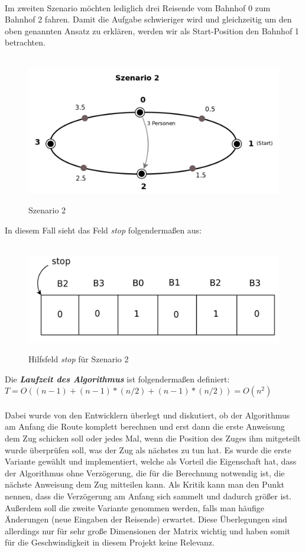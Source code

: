 \\
\noindent
Im zweiten Szenario möchten lediglich drei Reisende vom Bahnhof 0 zum Bahnhof 2 fahren. Damit die Aufgabe schwieriger wird und gleichzeitig um den oben genannten Ansatz zu erklären, werden wir als Start-Position den Bahnhof 1 betrachten.\\
\\
\begin{figure}[H]	
\caption{Szenario 2}
\includegraphics[width=2\textwidth, width=450pt]{content/images/szenario2.png}
\label{pic:szenario2}
\end{figure}
\noindent
In diesem Fall sieht das Feld \textit{stop} folgendermaßen aus:\\
\\
\begin{figure}[H]	
\caption{Hilfsfeld \textit{stop} für Szenario 2}
\includegraphics[width=2\textwidth, width=290pt]{content/images/stop2.png}
\label{pic:stop2}
\end{figure}
\noindent
Die \textbf{\textit{Laufzeit des Algorithmus}} ist folgendermaßen definiert:\\
$T = O( (n-1) + (n-1)*(n/2) + (n-1)*(n/2) ) = O(n^2)$\\
\\
Dabei wurde von den Entwicklern überlegt und diskutiert, ob der Algorithmus am Anfang die Route komplett berechnen und erst dann die erste Anweisung dem Zug schicken soll oder jedes Mal, wenn die Position des Zuges ihm mitgeteilt wurde überprüfen soll, was der Zug als nächstes zu tun hat. Es wurde die erste Variante gewählt und implementiert, welche als Vorteil die Eigenschaft hat, dass der Algorithmus ohne Verzögerung, die für die Berechnung notwendig ist, die nächste Anweisung dem Zug mitteilen kann. Als Kritik kann man den Punkt nennen, dass die Verzögerung am Anfang sich sammelt und dadurch größer ist. Außerdem soll die zweite Variante genommen werden, falls man häufige Änderungen (neue Eingaben der Reisende) erwartet. Diese Überlegungen sind allerdings nur für sehr große Dimensionen der Matrix wichtig und haben somit für die Geschwindigkeit in diesem Projekt keine Relevanz.\\
